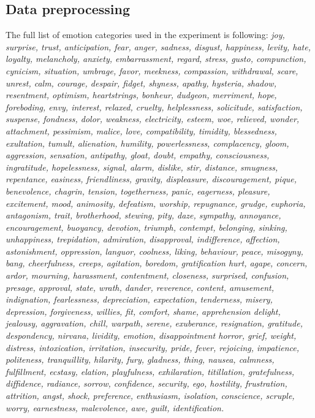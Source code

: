 \documentclass{llncs}
\begin{document}
\subsection{Data preprocessing} 
The full list of emotion categories used in the experiment is following:
\textit{joy, surprise, trust, anticipation, fear, anger, sadness, disgust, happiness, levity, hate, loyalty, melancholy, anxiety, embarrassment,  regard, stress, gusto, compunction, cynicism, situation, umbrage, favor, meekness, compassion, withdrawal, scare, unrest, calm, courage, despair, fidget, shyness, apathy, hysteria, shadow, resentment, optimism, heartstrings, bonheur, dudgeon, merriment, hope, foreboding, envy, interest, relaxed, cruelty, helplessness,   solicitude, satisfaction,   suspense, fondness, dolor, weakness, electricity, esteem, woe, relieved, wonder, attachment, pessimism, malice, love, compatibility, timidity, blessedness, exultation, tumult, alienation, humility, powerlessness, complacency, gloom, aggression, sensation, antipathy, gloat, doubt, empathy, consciousness, ingratitude, hopelessness, signal, alarm, dislike, stir, distance, smugness, repentance, easiness, friendliness, gravity, displeasure, discouragement, pique, benevolence, chagrin, tension, togetherness, panic, eagerness, pleasure, excitement, mood, animosity, defeatism, worship, repugnance, grudge, euphoria, antagonism, trait, brotherhood, stewing, pity, daze, sympathy, annoyance, encouragement,  buoyancy, devotion, triumph, contempt, belonging, sinking, unhappiness, trepidation, admiration, disapproval, indifference, affection, astonishment, oppression, languor, coolness, liking, behaviour, peace, misogyny, bang, cheerfulness, creeps, agitation, boredom, gratification  hurt, agape, concern, ardor, mourning, harassment, contentment, closeness, surprised, confusion, presage, approval, state, wrath, dander, reverence, content, amusement, indignation, fearlessness, depreciation, expectation, tenderness, misery, depression, forgiveness, willies, fit, comfort, shame, apprehension   delight, jealousy, aggravation, chill, warpath, serene, exuberance, resignation, gratitude, despondency, nirvana, lividity, emotion, disappointment horror, grief, weight, distress, intoxication, irritation, insecurity, pride, fever, rejoicing, impatience, politeness, tranquillity, hilarity, fury, gladness, thing, nausea, calmness, fulfillment, ecstasy, elation, playfulness, exhilaration, titillation, gratefulness, diffidence, radiance, sorrow, confidence, security, ego, hostility, frustration, attrition, angst, shock, preference, enthusiasm, isolation, conscience, scruple, worry, earnestness, malevolence, awe, guilt, identification.}
\end{document}
